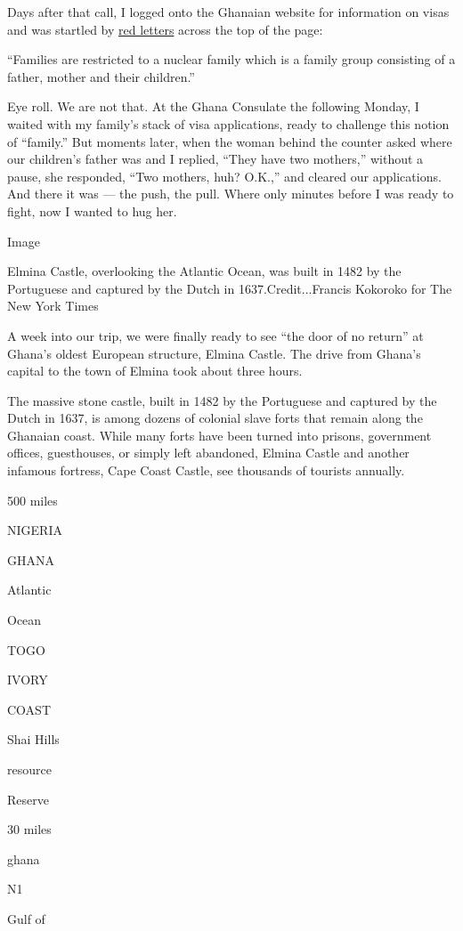 Days after that call, I logged onto the Ghanaian website for information
on visas and was startled by
\href{https://www.ghanaconsulatenewyork.org/gcn/FamilyClientStart.aspx}{red
letters} across the top of the page:

``Families are restricted to a nuclear family which is a family group
consisting of a father, mother and their children.''

Eye roll. We are not that. At the Ghana Consulate the following Monday,
I waited with my family's stack of visa applications, ready to challenge
this notion of ``family.'' But moments later, when the woman behind the
counter asked where our children's father was and I replied, ``They have
two mothers,'' without a pause, she responded, ``Two mothers, huh?
O.K.,'' and cleared our applications. And there it was --- the push, the
pull. Where only minutes before I was ready to fight, now I wanted to
hug her.

Image

Elmina Castle, overlooking the Atlantic Ocean, was built in 1482 by the
Portuguese and captured by the Dutch in 1637.Credit...Francis Kokoroko
for The New York Times

A week into our trip, we were finally ready to see ``the door of no
return'' at Ghana's oldest European structure, Elmina Castle. The drive
from Ghana's capital to the town of Elmina took about three hours.

The massive stone castle, built in 1482 by the Portuguese and captured
by the Dutch in 1637, is among dozens of colonial slave forts that
remain along the Ghanaian coast. While many forts have been turned into
prisons, government offices, guesthouses, or simply left abandoned,
Elmina Castle and another infamous fortress, Cape Coast Castle, see
thousands of tourists annually.

500 miles

NIGERIA

GHANA

Atlantic

Ocean

TOGO

IVORY

COAST

Shai Hills

resource

Reserve

30 miles

ghana

N1

Gulf of

